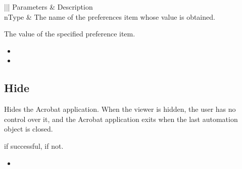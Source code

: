 \documentclass[letterpaper,12pt,english,openany,oneside]{sphinxmanual}
\begin{document}
\begin{savenotes}\sphinxattablestart
\centering
{}\label{\detokenize{IAC_API_OLE_Objects:section-5}}\nobreak
\begin{tabular}[t]{|||}
\hline
\sphinxstyletheadfamily 
Parameters
&\sphinxstyletheadfamily 
Description
\\
\hline
nType
&
The name of the preferences item whose value is obtained.
\\
\hline
\end{tabular}
\par
\sphinxattableend\end{savenotes}


The value of the specified preference item.

\label{\detokenize{IAC_API_OLE_Objects:related-methods-9}}
\begin{itemize}
\item {} 
 

\item {} 
 

\end{itemize}




\subsection{Hide}
\label{\detokenize{IAC_API_OLE_Objects:hide}}
Hides the Acrobat application. When the viewer is hidden, the user has no control over it, and the Acrobat application exits when the last automation object is closed.


\begin{sphinxVerbatim}[commandchars=\\\{\}]
 
\end{sphinxVerbatim}


 if successful,  if not.

\label{\detokenize{IAC_API_OLE_Objects:related-methods-10}}
\begin{itemize}
\item {} 
 

\end{itemize}
\end{document}
